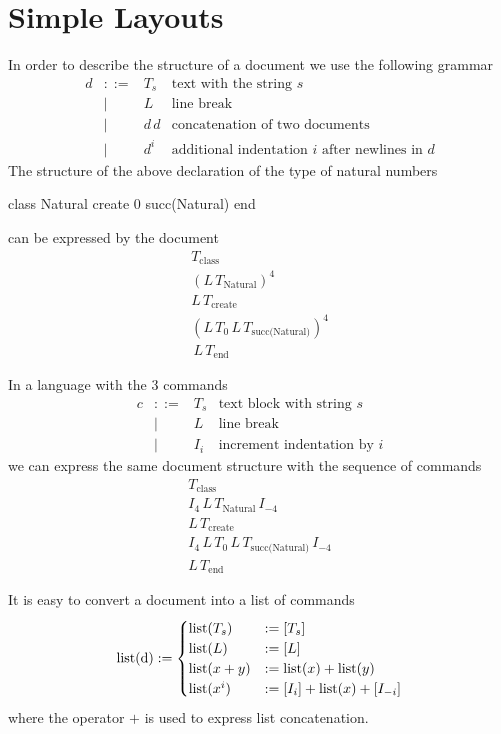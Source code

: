 \documentclass[12pt]{article}
\def\class{\text{class}}
\def\create{\text{create}}
\def\kwend{\text{end}}
\def\Natural{\text{Natural}}
\begin{document}
\section{Simple Layouts}

In order to describe the structure of a document we use the following grammar
$$
\begin{array}{llll}
  d &::=& T_s      & \text{text with the string } s
  \\
    & \mid & L     & \text{line break}
  \\
    & \mid & d\, d & \text{concatenation of two documents}
  \\
    & \mid & d^i   & \text{additional indentation $i$ after newlines in } d
\end{array}
$$%
%
The structure of the above declaration of the type of natural numbers
\begin{alba}
    class
        Natural
    create
        0
        succ(Natural)
    end
\end{alba}
%
can be expressed by the document
$$
\begin{array}{l}
  T_\class \,
  \\
  (L \, T_\Natural)^4 \, \\
  L \, T_\create \, \\
  (L \, T_0 \, L \, T_\text{succ(Natural)})^4 \\
  \, L \, T_\text{end}
\end{array}
$$%

In a language with the 3 commands
$$
\begin{array}{llll}
  c & ::= & T_s         & \text{text block with string } s
  \\
    & \mid &  L         & \text{line break}
  \\
    & \mid &  I_i     & \text{increment indentation by } i
\end{array}
$$%
we can express the same document structure with the sequence of commands
$$
\begin{array}{l}
  T_\class\, \\
  I_4\, L\, T_\Natural\, I_{-4}\, \\
  L\, T_\create\, \\
  I_4\, L\, T_0\, L\, T_\text{succ(Natural)}\, I_{-4} \\
  L\, T_\kwend
\end{array}
$$

It is easy to convert a document into a list of commands
{\def\coms{\text{list}}
  $$
  \text{\coms(d)} :=
  \begin{cases}
    \coms(T_s) &:= [T_s]
    \\
    \coms(L) &:= [L]
    \\
    \coms(x+y) &:= \coms(x) + \coms(y)
    \\
    \coms(x^i) &:= [I_i] + \coms(x) + [I_{-i}]
  \end{cases}
  $$
}
where the operator $+$ is used to express list concatenation.
\end{document}
